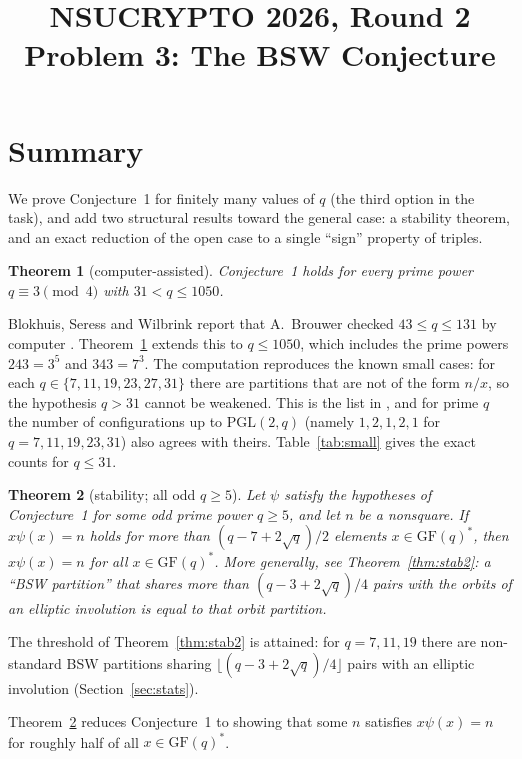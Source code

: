 \documentclass[11pt,a4paper]{article}
\title{NSUCRYPTO 2026, Round 2\\Problem 3: The BSW Conjecture}
\date{}
\newtheorem{theorem}{Theorem}
\theoremstyle{definition}
\theoremstyle{remark}
\newcommand{\GF}{\mathrm{GF}}
\newcommand{\PGL}{\mathrm{PGL}}
\newcommand{\QMAX}{1050}
\begin{document}
\maketitle

\section*{Summary}

We prove Conjecture~1 for finitely many values of $q$ (the third option in the task), and add two structural
results toward the general case: a stability theorem, and an exact reduction of the open case to a single
``sign'' property of triples.

\begin{theorem}[computer-assisted]\label{thm:main}
Conjecture~1 holds for every prime power $q\equiv 3\pmod 4$ with $31<q\le \QMAX$.
\end{theorem}

Blokhuis, Seress and Wilbrink report that A.~Brouwer checked $43\le q\le131$ by computer \cite[\S3]{BSW}.
Theorem~\ref{thm:main} extends this to $q\le\QMAX$, which includes the prime powers $243=3^5$ and $343=7^3$. The
computation reproduces the known small cases: for each $q\in\{7,11,19,23,27,31\}$ there are partitions that are
not of the form $n/x$, so the hypothesis $q>31$ cannot be weakened. This is the list in \cite[\S3]{BSW}, and for
prime $q$ the number of configurations up to $\PGL(2,q)$ (namely $1,2,1,2,1$ for $q=7,11,19,23,31$) also agrees
with theirs. Table~\ref{tab:small} gives the exact counts for $q\le31$.

\begin{theorem}[stability; all odd $q\ge5$]\label{thm:stab}
Let $\psi$ satisfy the hypotheses of Conjecture~1 for some odd prime power $q\ge 5$, and let $n$ be a nonsquare.
If $x\psi(x)=n$ holds for more than $(q-7+2\sqrt q)/2$ elements $x\in\GF(q)^*$, then $x\psi(x)=n$ for all
$x\in\GF(q)^*$. More generally, see Theorem~\ref{thm:stab2}: a ``BSW partition'' that shares more than
$(q-3+2\sqrt q)/4$ pairs with the orbits of an elliptic involution is equal to that orbit partition.
\end{theorem}

The threshold of Theorem~\ref{thm:stab2} is attained: for $q=7,11,19$ there are non-standard BSW partitions sharing
$\lfloor(q-3+2\sqrt q)/4\rfloor$ pairs with an elliptic involution (Section~\ref{sec:stats}).

Theorem~\ref{thm:stab} reduces Conjecture~1 to showing that some $n$ satisfies $x\psi(x)=n$ for roughly
half of all $x\in\GF(q)^*$.
\end{document}
